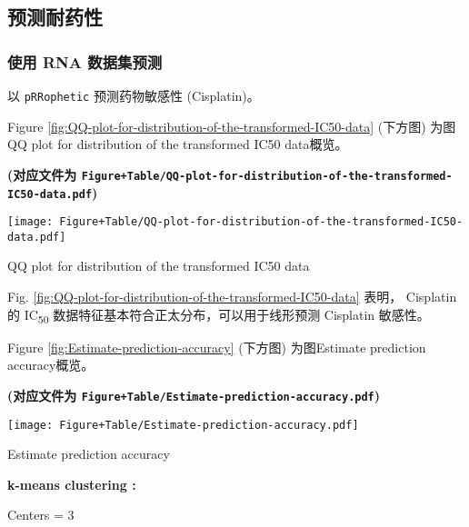 \documentclass[
]{article}
\begin{document}
\hypertarget{ux9884ux6d4bux8010ux836fux6027}{%
\subsection{预测耐药性}\label{ux9884ux6d4bux8010ux836fux6027}}

\hypertarget{ux4f7fux7528-rna-ux6570ux636eux96c6ux9884ux6d4b}{%
\subsubsection{使用 RNA 数据集预测}\label{ux4f7fux7528-rna-ux6570ux636eux96c6ux9884ux6d4b}}

以 \texttt{pRRophetic} 预测药物敏感性 (Cisplatin)。

Figure \ref{fig:QQ-plot-for-distribution-of-the-transformed-IC50-data} (下方图) 为图QQ plot for distribution of the transformed IC50 data概览。

\textbf{(对应文件为 \texttt{Figure+Table/QQ-plot-for-distribution-of-the-transformed-IC50-data.pdf})}

\def\@captype{figure}
\begin{center}
\texttt{[image: Figure+Table/QQ-plot-for-distribution-of-the-transformed-IC50-data.pdf]}
\caption{QQ plot for distribution of the transformed IC50 data}\label{fig:QQ-plot-for-distribution-of-the-transformed-IC50-data}
\end{center}

Fig. \ref{fig:QQ-plot-for-distribution-of-the-transformed-IC50-data} 表明，
Cisplatin 的 IC\textsubscript{50} 数据特征基本符合正太分布，可以用于线形预测 Cisplatin 敏感性。

Figure \ref{fig:Estimate-prediction-accuracy} (下方图) 为图Estimate prediction accuracy概览。

\textbf{(对应文件为 \texttt{Figure+Table/Estimate-prediction-accuracy.pdf})}

\def\@captype{figure}
\begin{center}
\texttt{[image: Figure+Table/Estimate-prediction-accuracy.pdf]}
\caption{Estimate prediction accuracy}\label{fig:Estimate-prediction-accuracy}
\end{center}

\begin{center}\begin{tcolorbox}[colback=gray!10, colframe=gray!50, width=0.9\linewidth, arc=1mm, boxrule=0.5pt]
\textbf{
k-means clustering
:}

\vspace{0.5em}

    Centers = 3

\vspace{2em}
\end{tcolorbox}
\end{center}
\end{document}
